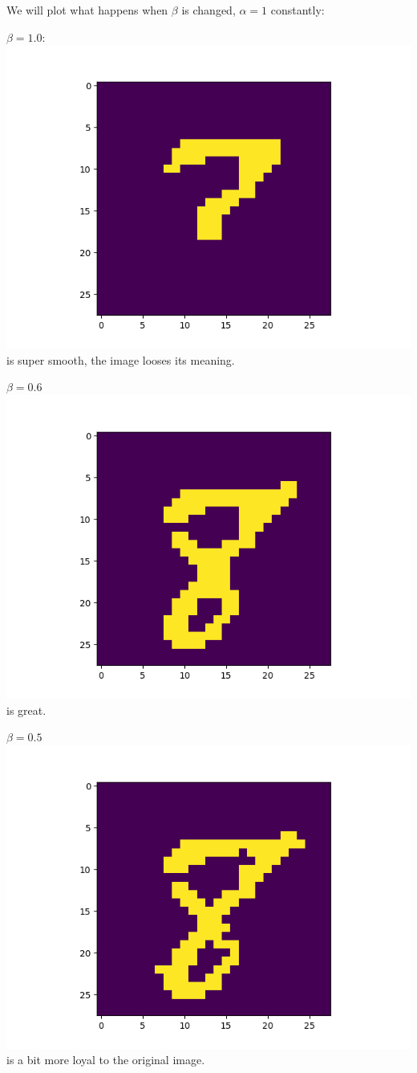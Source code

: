 \documentclass[11pt]{article}
\begin{document}
We will plot what happens when $\beta$ is changed, $\alpha=1$ constantly:

$\beta=1.0$:
\includegraphics[scale=0.2]{alpha_1_beta_1}
is super smooth, the image looses its meaning.

$\beta=0.6$
\includegraphics[scale=0.2]{alpha_1_beta_06}
is great.

$\beta=0.5$
\includegraphics[scale=0.2]{alpha_1_beta_05}
is a bit more loyal to the original image.
\end{document}
